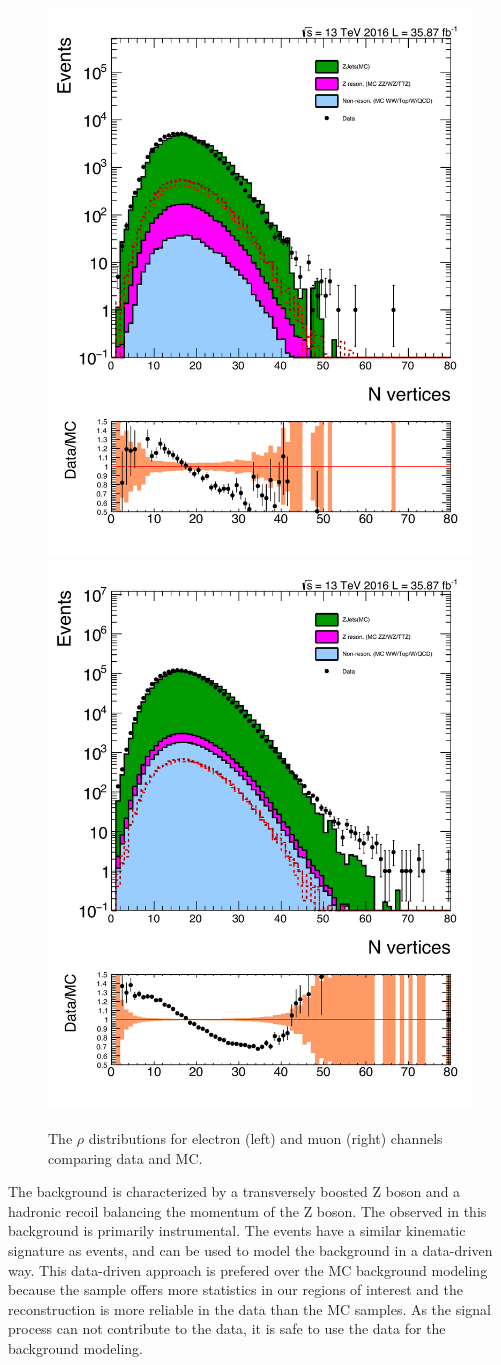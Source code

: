 \begin{figure}[htbp!]
\centering
\includegraphics[width=0.46\linewidth, page=2]{figures/ReMiniSummer16_MC_GMCPhPtWt_tightzpt50_puWeightsummer16_metfilter_unblind_el_log_1pb.pdf}
\includegraphics[width=0.46\linewidth, page=2]{figures/ReMiniSummer16_MC_GMCPhPtWt_tightzpt50_puWeightsummer16_metfilter_unblind_mu_log_1pb.pdf}
\caption{The $\rho$ distributions for electron (left) and muon (right) channels comparing data and MC.}
\label{fig:mc_rho}
\end{figure}

\vspace{0.3cm}
The \Zjets background is characterized by a transversely boosted Z boson and a hadronic recoil balancing the momentum of the Z boson. The observed \ptmiss in this background is primarily instrumental. The \gjets events have a similar kinematic signature as \Zjets events, and can be used to model the \Zjets background in a data-driven way. This \gjets data-driven approach is prefered over the MC background modeling because the \gjets sample offers more statistics in our regions of interest and the \ptmiss reconstruction is more reliable in the \gjets data than the MC samples. As the signal process can not contribute to the \gjets data, it is safe to use the \gjets data for the background modeling.

